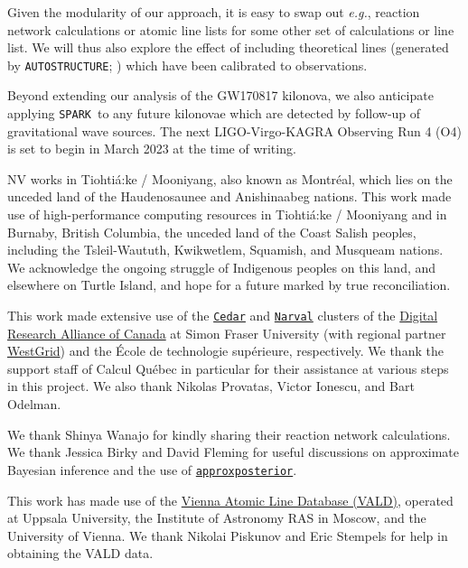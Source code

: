 \documentclass[twocolumn, twocolappendix]{aastex63}
\def\SPARK{\texttt{SPARK}}
\def\AUTOSTRUCTURE{\texttt{AUTOSTRUCTURE}}
\def\approxposterior{\texttt{approxposterior}}
\def\eg{{\it e.g.}}
\begin{document}
Given the modularity of our approach, it is easy to swap out \eg, reaction network calculations or atomic line lists for some other set of calculations or line list. We will thus also explore the effect of including theoretical lines (generated by \AUTOSTRUCTURE; \citealt{badnell16}) which have been calibrated to observations. 

Beyond extending our analysis of the GW170817 kilonova, we also anticipate applying \SPARK~to any future kilonovae which are detected by follow-up of gravitational wave sources. The next LIGO-Virgo-KAGRA Observing Run 4 (O4) is set to begin in March 2023 at the time of writing.



\acknowledgments

NV works in Tiohti{\'a}:ke / Mooniyang, also known as Montr{\'e}al, which lies on the unceded land of the Haudenosaunee and Anishinaabeg nations. This work made use of high-performance computing resources in Tiohti{\'a}:ke / Mooniyang and in Burnaby, British Columbia, the unceded land of the Coast Salish peoples, including the Tsleil-Waututh, Kwikwetlem, Squamish, and Musqueam nations. We acknowledge the ongoing struggle of Indigenous peoples on this land, and elsewhere on Turtle Island, and hope for a future marked by true reconciliation. 

This work made extensive use of the \href{https://docs.alliancecan.ca/wiki/Cedar}{\texttt{Cedar}} and \href{https://docs.alliancecan.ca/wiki/Narval/en}{\texttt{Narval}} clusters of the \href{https://alliancecan.ca/en}{Digital Research Alliance of Canada} at Simon Fraser University (with regional partner \href{https://www.westgrid.ca/}{WestGrid}) and the {\'E}cole de technologie sup{\'e}rieure, respectively. We thank the support staff of Calcul Qu{\'e}bec in particular for their assistance at various steps in this project. We also thank Nikolas Provatas, Victor Ionescu, and Bart Odelman.

We thank Shinya Wanajo for kindly sharing their reaction network calculations. We thank Jessica Birky and David Fleming for useful discussions on approximate Bayesian inference and the use of \href{https://dflemin3.github.io/approxposterior/index.html}{\approxposterior}.

This work has made use of the \href{http://vald.astro.uu.se/~vald/php/vald.php}{Vienna Atomic Line Database (VALD)}, operated at Uppsala University, the Institute of Astronomy RAS in Moscow, and the University of Vienna. We thank Nikolai Piskunov and Eric Stempels for help in obtaining the VALD data.
\end{document}
